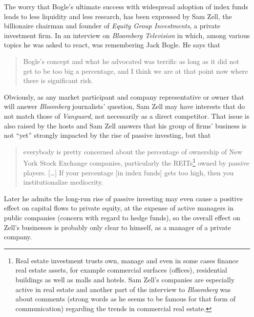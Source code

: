 The worry that Bogle's ultimate success with widespread adoption of index funds leads to less liquidity and less research, has been expressed by Sam Zell, the billionaire chairman and founder of \textit{Equity Group Investments}, a private investment firm. In an interview on \textit{Bloomberg Television} in which, among various topics he was asked to react, was remembering Jack Bogle. He says that
\begin{quotation}
Bogle's concept and what he advocated was terrific as long as it did not get to be too big a percentage, and I think we are at that point now where there is significant risk.
\end{quotation}
Obviously, as any market participant and company representative or owner that will answer \textit{Bloomberg} journalists' question, Sam Zell may have interests that do not match those of \textit{Vanguard}, not necessarily as a direct competitor. That issue is also raised by the hosts and Sam Zell answers that his group of firms' business is not ``yet'' strongly impacted by the rise of passive investing, but that
\begin{quotation}
everybody is pretty concerned about the percentage of ownership of New York Stock Exchange companies, particularly the REITs\footnote{Real estate investment trusts own, manage and even in some cases finance real estate assets, for example commercial surfaces (offices), residential buildings as well as malls and hotels. Sam Zell's companies are especially active in real estate and another part of the interview to \textit{Bloomberg} was about comments (strong words as he seems to be famous for that form of communication) regarding the trends in commercial real estate.} owned by passive players. [\ldots] If your percentage [in index funds] gets too high, then you institutionalize mediocrity.
\end{quotation}

Later he admits the long-run rise of passive investing may even cause a positive effect on capital flows to private equity, at the expense of active managers in public companies (concern with regard to hedge funds), so the overall effect on Zell's businesses is probably only clear to himself, as a manager of a private company. 

